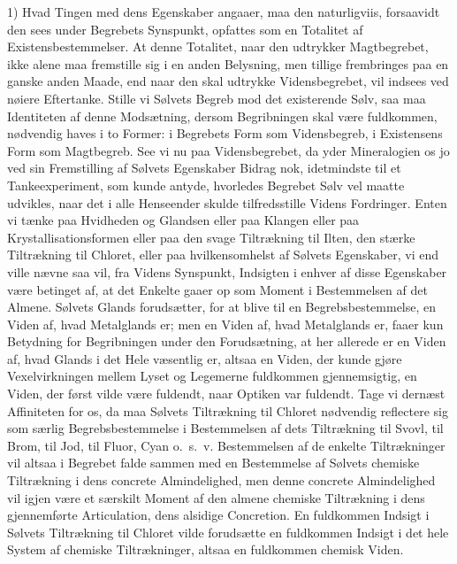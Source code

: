 \documentclass[12pt]{book}
\newcommand{\opage}[1]{\marginnote{\footnotesize\textit{[#1]}}}
\begin{document}
1) Hvad Tingen med dens Egenskaber angaaer, maa den naturligviis, forsaavidt den sees under
Begrebets Synspunkt, opfattes som en Totalitet af Existensbestemmelser. At denne Totalitet, naar
den udtrykker Magtbegrebet, ikke alene maa fremstille sig i en anden Belysning, men tillige
frembringes paa en ganske anden Maade, end naar den skal udtrykke Vidensbegrebet, vil indsees ved
nøiere Eftertanke.
\opage{202} Stille vi Sølvets Begreb mod det existerende Sølv, saa maa Identiteten af denne Modsætning, dersom
Begribningen skal være fuldkommen, nødvendig haves i to Former: i Begrebets Form som Vidensbegreb,
i Existensens Form som Magtbegreb. See vi nu paa Vidensbegrebet, da yder Mineralogien os jo ved sin
Fremstilling af Sølvets Egenskaber Bidrag nok, idetmindste til et Tankeexperiment, som kunde antyde,
hvorledes Begrebet Sølv vel maatte udvikles, naar det i alle Henseender skulde tilfredsstille Videns
Fordringer. Enten vi tænke paa Hvidheden og Glandsen eller paa Klangen eller paa
Krystallisationsformen eller paa den svage Tiltrækning til Ilten, den stærke Tiltrækning til
Chloret, eller paa hvilkensomhelst af Sølvets Egenskaber, vi end ville nævne saa vil, fra Videns
Synspunkt, Indsigten i enhver af disse Egenskaber være betinget af, at det Enkelte gaaer op som
Moment i Bestemmelsen af det Almene. Sølvets Glands forudsætter, for at blive til en
Begrebsbestemmelse, en Viden af, hvad Metalglands er; men en Viden af, hvad Metalglands er, faaer
kun Betydning for Begribningen under den Forudsætning, at her allerede er en Viden af, hvad Glands
i det Hele væsentlig er, altsaa en Viden, der kunde gjøre Vexelvirkningen mellem Lyset og Legemerne
fuldkommen gjennemsigtig, en Viden, der først vilde være fuldendt, naar Optiken var fuldendt. Tage
vi dernæst Affiniteten for os, da maa Sølvets Tiltrækning til Chloret nødvendig reflectere sig som
særlig Begrebsbestemmelse i Bestemmelsen af dets Tiltrækning til Svovl, til Brom, til Jod, til
Fluor, Cyan o.\ s.\ v. Bestemmelsen af de enkelte Tiltrækninger vil altsaa i Begrebet falde sammen
med en Bestemmelse af Sølvets chemiske Tiltrækning i dens concrete Almindelighed, men denne concrete
Almindelighed vil igjen være et særskilt Moment af den almene chemiske Tiltrækning i dens
gjennemførte Articulation, dens alsidige Concretion. En fuldkommen Indsigt i Sølvets Tiltrækning til
Chloret vilde forudsætte en fuldkommen Indsigt
\opage{203} i det hele System af chemiske Tiltrækninger, altsaa en fuldkommen chemisk Viden.
\end{document}

